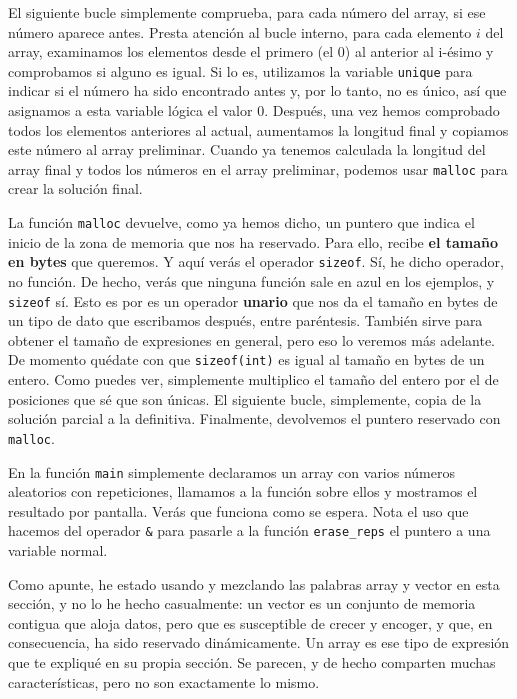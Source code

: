 \documentclass[a4paper]{article}
\begin{document}
El siguiente bucle
simplemente comprueba, para cada número del array, si ese número aparece antes.
Presta atención al bucle interno, para cada elemento $i$ del array, examinamos
los elementos desde el primero (el 0) al anterior al i-ésimo y comprobamos si
alguno es igual. Si lo es,
utilizamos la variable \verb!unique! para indicar si el número ha sido
encontrado antes y, por lo tanto, no es único, así que asignamos a esta variable
lógica el valor 0.
Después, una vez hemos comprobado todos los
elementos anteriores al actual, aumentamos la longitud final y copiamos este
número al array preliminar. Cuando ya tenemos calculada la longitud del array
final y todos los números en el array preliminar, podemos usar \verb!malloc!
para crear la solución final.

La función \verb!malloc! devuelve, como ya hemos dicho, un puntero que indica
el inicio de la zona de memoria que nos ha reservado. Para ello, recibe
\textbf{el tamaño en bytes} que queremos. Y aquí verás el operador
\lstinline[style=C]{sizeof}. Sí, he dicho operador, no función. De hecho,
verás que ninguna función sale en azul en los ejemplos, y \verb!sizeof! sí.
Esto es por es un operador \textbf{unario} que nos da el tamaño en bytes
de un tipo de dato que escribamos después, entre paréntesis. También sirve para
obtener el tamaño de expresiones en general, pero eso lo veremos más adelante.
De momento quédate con que \verb!sizeof(int)! es igual al
tamaño en bytes de un entero. Como puedes ver, simplemente multiplico el tamaño
del entero por el de posiciones que sé que son únicas. El siguiente bucle,
simplemente, copia de la solución parcial a la definitiva. Finalmente,
devolvemos el puntero reservado con \verb!malloc!.

En la función \verb!main! simplemente declaramos un array con varios números
aleatorios con repeticiones, llamamos a la función sobre ellos y mostramos el
resultado por pantalla. Verás que funciona como se espera. Nota el uso que
hacemos del operador \verb!&! para pasarle a la función \verb!erase_reps! el
puntero a una variable normal.

Como apunte, he estado usando y mezclando las palabras array y vector en esta
sección, y no lo he hecho casualmente: un vector es un conjunto de memoria
contigua que aloja datos, pero que es susceptible de crecer y encoger, y que,
en consecuencia, ha sido reservado dinámicamente. Un array es ese tipo de
expresión que te expliqué en su propia sección. Se parecen, y de hecho comparten
muchas características, pero no son exactamente lo mismo.
\end{document}
